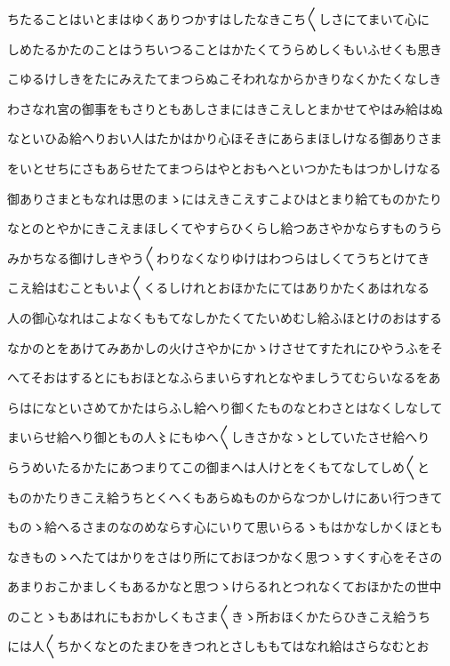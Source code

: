 \documentclass[a4paper,11pt,landscape]{ltjtarticle}
\begin{document}
ちたることはいとまはゆくありつかすはしたなきこち〱しさにてまいて心に
\par\medskip
しめたるかたのことはうちいつることはかたくてうらめしくもいふせくも思き
\par\medskip
こゆるけしきをたにみえたてまつらぬこそわれなからかきりなくかたくなしき
\par\medskip
わさなれ宮の御事をもさりともあしさまにはきこえしとまかせてやはみ給はぬ
\par\medskip
なといひゐ給へりおい人はたかはかり心ほそきにあらまほしけなる御ありさま
\par\medskip
をいとせちにさもあらせたてまつらはやとおもへといつかたもはつかしけなる
\par\medskip
御ありさまともなれは思のまゝにはえきこえすこよひはとまり給てものかたり
\par\medskip
なとのとやかにきこえまほしくてやすらひくらし給つあさやかならすものうら
\par\medskip
みかちなる御けしきやう〱わりなくなりゆけはわつらはしくてうちとけてき
\par\medskip
こえ給はむこともいよ〱くるしけれとおほかたにてはありかたくあはれなる
\par\medskip
人の御心なれはこよなくももてなしかたくてたいめむし給ふほとけのおはする
\par\medskip
なかのとをあけてみあかしの火けさやかにかゝけさせてすたれにひやうふをそ
\par\medskip
へてそおはするとにもおほとなふらまいらすれとなやましうてむらいなるをあ
\par\medskip
らはになといさめてかたはらふし給へり御くたものなとわさとはなくしなして
\par\medskip
まいらせ給へり御ともの人〻にもゆへ〱しきさかなゝとしていたさせ給へり
\par\medskip
らうめいたるかたにあつまりてこの御まへは人けとをくもてなしてしめ〱と
\par\medskip
ものかたりきこえ給うちとくへくもあらぬものからなつかしけにあい行つきて
\par\medskip
ものゝ給へるさまのなのめならす心にいりて思いらるゝもはかなしかくほとも
\par\medskip
なきものゝへたてはかりをさはり所にておほつかなく思つゝすくす心をそさの
\par\medskip
あまりおこかましくもあるかなと思つゝけらるれとつれなくておほかたの世中
\par\medskip
のことゝもあはれにもおかしくもさま〱きゝ所おほくかたらひきこえ給うち
\par\medskip
には人〱ちかくなとのたまひをきつれとさしももてはなれ給はさらなむとお
\end{document}

